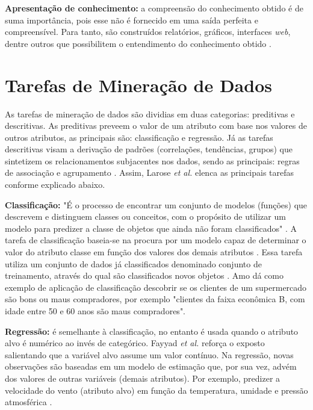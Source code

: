 \documentclass[tg]{mdtufsm}
\begin{document}
\textbf{Apresentação de conhecimento:} a compreensão do conhecimento obtido é de suma importância, pois esse não é fornecido em uma saída perfeita e compreensível. Para tanto, são construídos relatórios, gráficos, interfaces \textit{web}, dentre outros que possibilitem o entendimento do conhecimento obtido \cite{brauner}. 

\section{Tarefas de Mineração de Dados}

As tarefas de mineração de dados são dividias em duas categorias: preditivas e descritivas. As preditivas preveem o valor de um atributo com base nos valores de outros atributos, as principais são: classificação e regressão. Já as tarefas descritivas visam a derivação de padrões (correlações, tendências, grupos) que sintetizem os relacionamentos subjacentes nos dados, sendo as principais: regras de associação e agrupamento \cite{pang-ning}. Assim, Larose \textit{et al.} \citeyearpar{larose2005} elenca as principais tarefas conforme explicado abaixo.

\textbf{Classificação:} "É o processo de encontrar um conjunto de modelos (funções) que descrevem e distinguem classes ou conceitos, com o propósito de utilizar um modelo para predizer a classe de objetos que ainda não foram classificados" \cite{amo2003}. A tarefa de classificação baseia-se na procura por um modelo capaz de determinar o valor do atributo classe em função dos valores dos demais atributos \cite{pang-ning}. Essa tarefa utiliza um conjunto de dados já classificados denominado conjunto de treinamento, através do qual são classificados novos objetos \cite{brauner}. Amo \citeyearpar{amo2003} dá como exemplo de aplicação de classificação descobrir se os clientes de um supermercado são bons ou maus compradores, por exemplo "clientes da faixa econômica B, com idade entre 50 e 60 anos são maus compradores". 

\textbf{Regressão:} é semelhante à classificação, no entanto é usada quando o atributo alvo é numérico ao invés de categórico. Fayyad \textit{et al.} \cite{fayyad} reforça o exposto salientando que a variável alvo assume um valor contínuo. Na regressão, novas observações são baseadas em um modelo de estimação que, por sua vez, advém dos valores de outras variáveis (demais atributos). Por exemplo, predizer a velocidade do vento (atributo alvo) em função da temperatura, umidade e pressão atmosférica \cite{pang-ning}.
\end{document}
